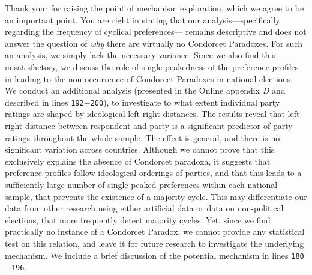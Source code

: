 \documentclass[a4paper, 12pt]{scrartcl}
\theoremstyle{break}
\begin{document}
Thank your for raising the point of mechanism exploration, which we agree to be an important point. You are right in stating that our analysis—specifically regarding the frequency of cyclical preferences— remains descriptive and does not answer the question of \textit{why} there are virtually no Condorcet Paradoxes. For such an analysis, we simply lack the necessary variance. Since we also find this unsatisfactory, we discuss the role of single-peakedness of the preference profiles in leading to the non-occurrence of Condorcet Paradoxes in national elections. We conduct an additional analysis (presented in the Online appendix \textit{D }and described in lines \texttt{192$-$200}), to investigate to what extent individual party ratings are shaped by ideological left-right distances. The results reveal that left-right distance between respondent and party is a significant predictor of party ratings throughout the whole sample. The effect is general, and there is no significant variation across countries. Although we cannot prove that this exclusively explains the absence of Condorcet paradoxa, it suggests that preference profiles follow ideological orderings of parties, and that this leads to a sufficiently large number of single-peaked preferences within each national sample, that prevents the existence of a majority cycle. This may differentiate our data from other research using either artificial data or data on non-political elections, that more frequently detect majority cycles. Yet, since we find practically no instance of a Condorcet Paradox, we cannot provide any statistical test on this relation, and leave it for future research to investigate the underlying mechanism. We include a brief discussion of the potential mechanism in lines \texttt{180$-$196}.

\end{document}

